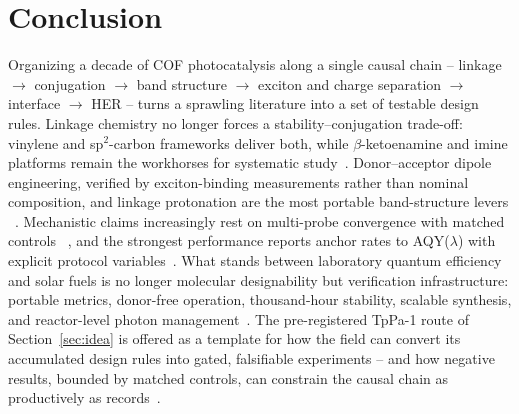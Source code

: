 \section{Conclusion}
\label{sec:conclusion}

Organizing a decade of COF photocatalysis along a single causal chain --
linkage $\rightarrow$ conjugation $\rightarrow$ band structure $\rightarrow$
exciton and charge separation $\rightarrow$ interface $\rightarrow$ HER --
turns a sprawling literature into a set of testable design rules. Linkage
chemistry no longer forces a stability--conjugation trade-off: vinylene and
sp$^2$-carbon frameworks deliver both, while $\beta$-ketoenamine and imine
platforms remain the workhorses for systematic study~\cite{jin20192d,
cheng2023fully,xue2023research}. Donor--acceptor dipole engineering,
verified by exciton-binding measurements rather than nominal composition,
and linkage protonation are the most portable band-structure levers
~\cite{qian2023computation,li2022covalent,yang2021protonated}. Mechanistic
claims increasingly rest on multi-probe convergence with matched controls
~\cite{ghosh2020identification,chu2024controlled}, and the strongest
performance reports anchor rates to AQY($\lambda$) with explicit protocol
variables~\cite{qiu2026atomically,zhao2024nanoscale}. What stands between
laboratory quantum efficiency and solar fuels is no longer molecular
designability but verification infrastructure: portable metrics,
donor-free operation, thousand-hour stability, scalable synthesis, and
reactor-level photon management~\cite{sun2025design,wu2025recent}. The
pre-registered TpPa-1 route of Section~\ref{sec:idea} is offered as a
template for how the field can convert its accumulated design rules into
gated, falsifiable experiments -- and how negative results, bounded by
matched controls, can constrain the causal chain as productively as
records~\cite{mo2020alkene,wang2026bandgap}.
